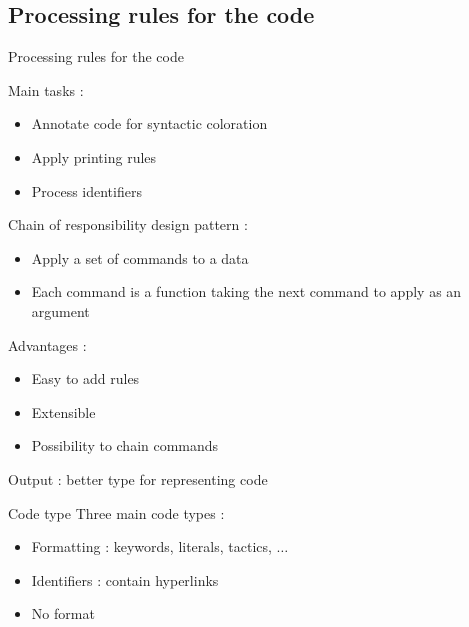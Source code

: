 \documentclass[compress]{beamer}
\newenvironment{tframe}[1]{
  \subsection{#1}
  \begin{frame}{#1}
  }{
  \end{frame}
  }
\begin{document}
  \begin{tframe}{Processing rules for the code}
        Main tasks :
        \begin{itemize}
          \item Annotate code for syntactic coloration
          \item Apply printing rules
          \item Process identifiers
        \end{itemize}
        \vfill
        Chain of responsibility design pattern :
        \begin{itemize}
          \item Apply a set of commands to a data
          \item Each command is a function taking the next command to apply as an argument
        \end{itemize}
        Advantages :
        \begin{itemize}
          \item Easy to add rules
          \item Extensible
          \item Possibility to chain commands
        \end{itemize}
        Output : better type for representing code
  \end{tframe}

  \begin{frame}{Code type}
    Three main code types :
    \begin{itemize}
      \item Formatting : keywords, literals, tactics, $\ldots$
      \item Identifiers : contain hyperlinks
      \item No format
    \end{itemize}
  \end{frame}
\end{document}
